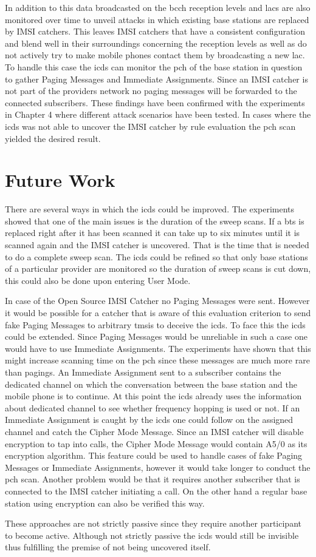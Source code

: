 In addition to this data broadcasted on the \gls{bcch} reception levels and \glspl{lac} are also monitored over time to unveil attacks in which existing base stations are replaced by IMSI catchers.
This leaves IMSI catchers that have a consistent configuration and blend well in their surroundings concerning the reception levels as well as do not actively try to make mobile phones contact them by broadcasting a new \gls{lac}.
To handle this case the \gls{icds} can monitor the \gls{pch} of the base station in question to gather Paging Messages and Immediate Assignments.
Since an IMSI catcher is not part of the providers network no paging messages will be forwarded to the connected subscribers.
These findings have been confirmed with the experiments in Chapter 4 where different attack scenarios have been tested.
In cases where the \gls{icds} was not able to uncover the IMSI catcher by rule evaluation the \gls{pch} scan yielded the desired result.

\section{Future Work}
There are several ways in which the \gls{icds} could be improved.
The experiments showed that one of the main issues is the duration of the sweep scans.
If a \gls{bts} is replaced right after it has been scanned it can take up to six minutes until it is scanned again and the IMSI catcher is uncovered.
That is the time that is needed to do a complete sweep scan.
The \gls{icds} could be refined so that only base stations of a particular provider are monitored so the duration of sweep scans is cut down, this could also be done upon entering User Mode.

In case of the Open Source IMSI Catcher no Paging Messages were sent.
However it would be possible for a catcher that is aware of this evaluation criterion to send fake Paging Messages to arbitrary \glspl{tmsi} to deceive the \gls{icds}.
To face this the \gls{icds} could be extended.
Since Paging Messages would be unreliable in such a case one would have to use Immediate Assignments.
The experiments have shown that this might increase scanning time on the \gls{pch} since these messages are much more rare than pagings.
An Immediate Assignment sent to a subscriber contains the dedicated channel on which the conversation between the base station and the mobile phone is to continue.
At this point the \gls{icds} already uses the information about dedicated channel to see whether frequency hopping is used or not.
If an Immediate Assignment is caught by the \gls{icds} one could follow on the assigned channel and catch the Cipher Mode Message.
Since an IMSI catcher will disable encryption to tap into calls, the Cipher Mode Message would contain A5/0 as its encryption algorithm.
This feature could be used to handle cases of fake Paging Messages or Immediate Assignments, however it would take longer to conduct the \gls{pch} scan.
Another problem would be that it requires another subscriber that is connected to the IMSI catcher initiating a call.
On the other hand a regular base station using encryption can also be verified this way.

These approaches are not strictly passive since they require another participant to become active.
Although not strictly passive the \gls{icds} would still be invisible thus fulfilling the premise of not being uncovered itself.

